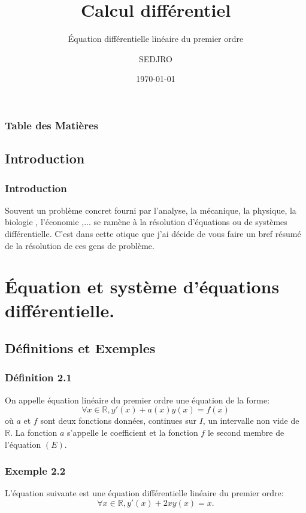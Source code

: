 \documentclass{beamer}
\title{Calcul différentiel }
\subtitle{Équation différentielle linéaire du premier ordre}
\author{SEDJRO }
\date{\today}
\begin{document}
\begin{frame}
    \titlepage
\end{frame}

\begin{frame}
    \frametitle{Table des Matières}
    \tableofcontents
\end{frame}




\begin{frame}
\section{Introduction}
\frametitle{Introduction}
Souvent un problème concret fourni par l'analyse, la mécanique, la physique, la biologie , l'économie ,... se ramène à la résolution d'équations ou de systèmes différentielle. C'est dans cette otique que j'ai décide de vous faire un bref résumé de la résolution de ces gens de problème.
\end{frame}



\newpage
\section{ Équation et système d'équations différentielle. }


\subsection{Définitions et Exemples}

\begin{frame}
    \frametitle{Définition 2.1}
    \begin{defi}
    On appelle équation linéaire du premier ordre une équation de la forme:
    \begin{equation*}\label{equ:1}
    \forall x \in \mathbb{R}, y'(x) + a(x)y(x) = f(x)
    \end{equation*}
    où $a$ et $f$ sont deux fonctions données, continues sur $I$, un intervalle non vide de $\mathbb{R}$. La fonction $a$ s'appelle le coefficient et la fonction $f$ le second membre de l'équation $(E)$.
    \end{defi}
\end{frame}

\begin{frame}
    \frametitle{Exemple 2.2}
    \begin{expl}
    L'équation suivante est une équation différentielle linéaire du premier ordre:
    \begin{equation*}
    \forall x \in \mathbb{R}, y'(x) + 2x y(x) = x.
    \end{equation*}
    \end{expl}
\end{frame}
\end{document}
